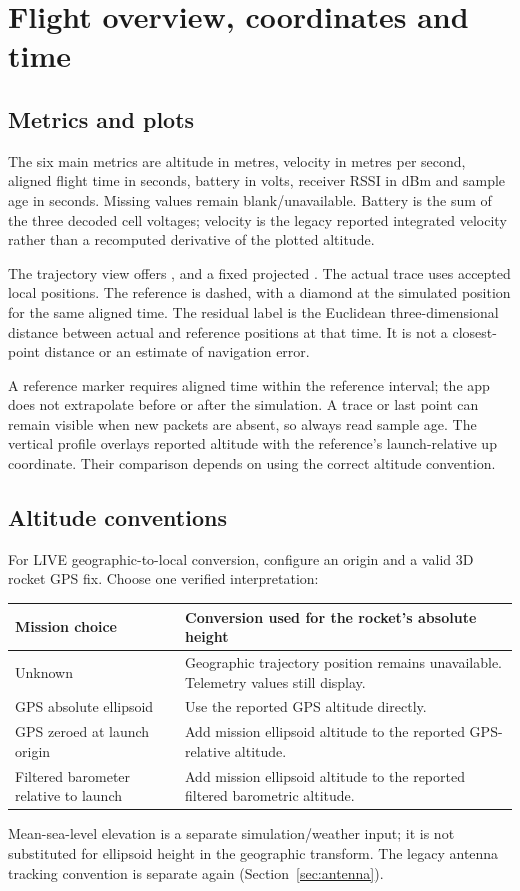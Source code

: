 \section{Flight overview, coordinates and time}\label{sec:flightview}
\subsection{Metrics and plots}
The six main metrics are altitude in metres, velocity in metres per second,
aligned flight time in seconds, battery in volts, receiver RSSI in dBm and sample
age in seconds. Missing values remain blank/unavailable. Battery is the sum of
the three decoded cell voltages; velocity is the legacy reported integrated
velocity rather than a recomputed derivative of the plotted altitude.

The trajectory view offers ,  and a fixed
projected . The actual trace uses accepted local positions. The
reference is dashed, with a diamond at the simulated position for the same
aligned time. The residual label is the Euclidean three-dimensional distance
between actual and reference positions at that time. It is not a closest-point
distance or an estimate of navigation error.

A reference marker requires aligned time within the reference interval; the
app does not extrapolate before or after the simulation. A trace or last point
can remain visible when new packets are absent, so always read sample age.
The vertical profile overlays reported altitude with the reference's
launch-relative up coordinate. Their comparison depends on using the correct
altitude convention.

\subsection{Altitude conventions}
For LIVE geographic-to-local conversion, configure an origin and a valid 3D
rocket GPS fix. Choose one verified interpretation:
\begin{longtable}{@{}L{.27\linewidth}L{.66\linewidth}@{}}
\toprule Mission choice & Conversion used for the rocket's absolute height \\\midrule\endhead
Unknown & Geographic trajectory position remains unavailable. Telemetry values still display. \\
GPS absolute ellipsoid & Use the reported GPS altitude directly. \\
GPS zeroed at launch origin & Add mission ellipsoid altitude to the reported GPS-relative altitude. \\
Filtered barometer relative to launch & Add mission ellipsoid altitude to the reported filtered barometric altitude. \\
\bottomrule
\end{longtable}
Mean-sea-level elevation is a separate simulation/weather input; it is not
substituted for ellipsoid height in the geographic transform. The legacy antenna
tracking convention is separate again (Section~\ref{sec:antenna}).

